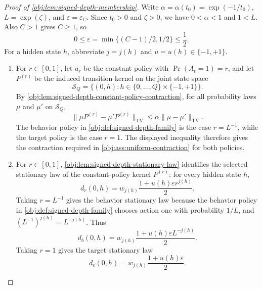 \documentclass[11pt]{article}
\begin{document}
\begin{proof}[Proof of \cref{obj:lem:signed-depth-membership}]
Write \(\alpha=\alpha(t_0)=\exp(-1/t_0)\), \(L=\exp(\zeta)\), and
\(\varepsilon=\varepsilon_C\).  Since \(t_0>0\) and \(\zeta>0\), we have
\(0<\alpha<1\) and \(1<L\).  Also \(C>1\) gives \(C\ge 1\), so
\[
0\le \varepsilon=\min\{(C-1)/2,1/2\}\le \frac12 .
\]
For a hidden state \(h\), abbreviate \(j=j(h)\) and \(u=u(h)\in\{-1,+1\}\).

\begin{enumerate}
\item For \(r\in[0,1]\), let \(a_r\) be the constant policy with
\(\Pr(A_t=1)=r\), and let \(P^{(r)}\) be the induced transition kernel on the
joint state space
\[
\mathcal S_Q=\{(0,h):h\in\{0,\ldots,Q\}\times\{-1,+1\}\}.
\]
By \cref{obj:lem:signed-depth-constant-policy-contraction}, for all probability
laws \(\mu\) and \(\mu'\) on \(\mathcal S_Q\),
\[
\|\mu P^{(r)}-\mu'P^{(r)}\|_{\mathrm{TV}}
\le
\alpha\|\mu-\mu'\|_{\mathrm{TV}}.
\]
The behavior policy in \cref{obj:def:signed-depth-family} is the case
\(r=L^{-1}\), while the target policy is the case \(r=1\).  The displayed
inequality therefore gives the contraction required in
\cref{obj:ass:uniform-contraction} for both policies. %

\item For \(r\in[0,1]\), \cref{obj:lem:signed-depth-stationary-law} identifies
the selected stationary law of the constant-policy kernel \(P^{(r)}\): for
every hidden state \(h\),
\[
d_r(0,h)
=
w_{j(h)}
\frac{1+u(h)\varepsilon r^{j(h)}}2 .
\]
Taking \(r=L^{-1}\) gives the behavior stationary law because the behavior
policy in \cref{obj:def:signed-depth-family} chooses action one with
probability \(1/L\), and \((L^{-1})^{j(h)}=L^{-j(h)}\).  Thus
\[
d_b(0,h)
=
w_{j(h)}
\frac{1+u(h)\varepsilon L^{-j(h)}}2 .
\]
Taking \(r=1\) gives the target stationary law
\[
d_e(0,h)
=
w_{j(h)}
\frac{1+u(h)\varepsilon}{2}.
\] %


\end{enumerate}
\end{proof}
\end{document}
